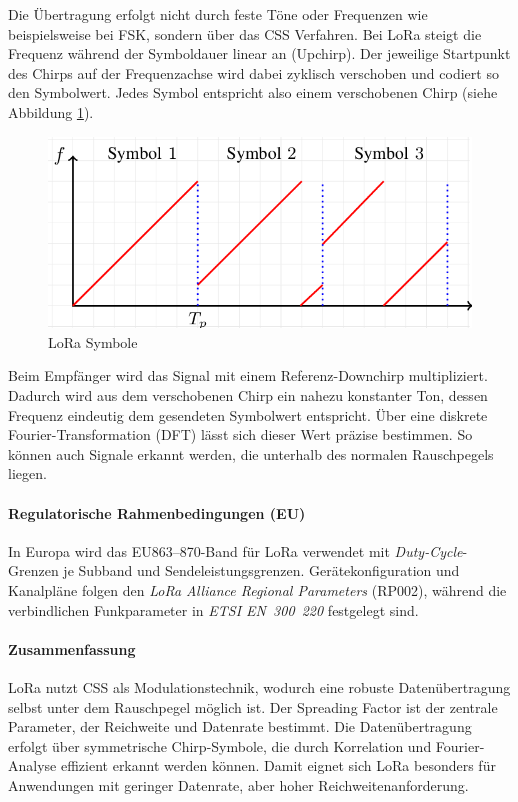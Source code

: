 Die Übertragung erfolgt nicht durch feste Töne oder Frequenzen wie beispielsweise bei FSK, sondern über das CSS Verfahren. Bei LoRa steigt die Frequenz während der Symboldauer linear an (Upchirp). Der jeweilige Startpunkt des Chirps auf der Frequenzachse wird dabei zyklisch verschoben und codiert so den Symbolwert. Jedes Symbol entspricht also einem verschobenen Chirp (siehe Abbildung \ref{fig:lora-symbole}). 

\begin{figure}[H]
\centering
\includegraphics[scale=.4]{figures/asstes/n-LoRa-CSS-each-symbol-is-encoded-as-a-single-circularly-shifted-chirp-and-covers-the.png}
\caption{LoRa Symbole \cite{inproceedings}}
\label{fig:lora-symbole}
\end{figure} 

Beim Empfänger wird das Signal mit einem Referenz-Downchirp multipliziert. Dadurch wird aus dem verschobenen Chirp ein nahezu konstanter Ton, dessen Frequenz eindeutig dem gesendeten Symbolwert entspricht. Über eine diskrete Fourier-Transformation (DFT) lässt sich dieser Wert präzise bestimmen. So können auch Signale erkannt werden, die unterhalb des normalen Rauschpegels liegen. \autocite{tulkaLoRaSpreadingFactor, 8067462}

\paragraph*{Regulatorische Rahmenbedingungen (EU)}
In Europa wird das EU863–870-Band für LoRa verwendet mit \emph{Duty-Cycle}-Grenzen je Subband und Sendeleistungsgrenzen. Gerätekonfiguration und Kanalpläne folgen den \emph{LoRa Alliance Regional Parameters} (RP002), während die verbindlichen Funkparameter in \emph{ETSI EN~300~220} festgelegt sind. 
\autocite{RP002104, ETSIEN3002202025}

\paragraph*{Zusammenfassung}  
LoRa nutzt CSS als Modulationstechnik, wodurch eine robuste Datenübertragung selbst unter dem Rauschpegel möglich ist. 
Der Spreading Factor ist der zentrale Parameter, der Reichweite und Datenrate bestimmt. 
Die Datenübertragung erfolgt über symmetrische Chirp-Symbole, die durch Korrelation und Fourier-Analyse effizient erkannt werden können. 
Damit eignet sich LoRa besonders für Anwendungen mit geringer Datenrate, aber hoher Reichweitenanforderung. 


